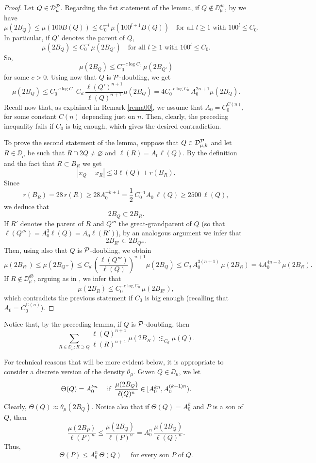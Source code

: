 \begin{proof}
	Let $Q\in{\mathcal D}_\mu^{\mathcal P}$. Regarding the fist statement of the lemma, if $Q\not\in\DD_\mu^{db}$, by  we have
	$$\mu(2B_Q)\leq \mu(100B(Q))\leq C_0^{-l}\,\mu(100^{l+1}B(Q))\quad
	\mbox{for all $l\geq1$ with $100^l\leq C_0$}.$$
	In particular, if $Q'$ denotes the parent of $Q$,
	$$\mu(2B_Q)\leq C_0^{-l}\,\mu(2B_{Q'})\quad
	\mbox{for all $l\geq1$ with $100^l\leq C_0$}.$$
	So,
	\begin{equation}\label{eqigu8208}
		\mu(2B_Q)\leq C_0^{-c\log C_0}\,\mu(2B_{Q'})
	\end{equation}
	for some $c>0$. Using now that $Q$ is ${\mathcal P}$-doubling, we get
	$$\mu(2B_Q)\leq C_0^{-c\log C_0}\,C_d\,\frac{\ell(Q')^{n+1}}{\ell(Q)^{n+1}} \mu(2B_Q)
	= 4C_0^{-c\log C_0}\,A_0^{2n+1} \mu(2B_Q)
	.$$
	Recall now that, as explained in Remark \ref{rema00}, we assume that $A_0=C_0^{C(n)}$, for some constant
	$C(n)$ depending just on $n$. Then, clearly, the preceding inequality fails if $C_0$ is big enough, which gives the desired contradiction.
	\vv
	
	To prove the second statement of the lemma, suppose that $Q\in{\mathcal D}_{\mu,k}^{\mathcal P}$ and let $R\in\DD_\mu$ be such that $R\cap 2Q\neq\varnothing$ and $\ell(R)=A_0\ell(Q)$.
	By the definition and the fact that $R\subset B_R$ we get
	$$|x_Q-x_R|\leq 3\ell(Q) + r(B_R).$$
	Since $$r(B_R)=28\,r(R) \geq 28A_0^{-k+1} = \frac12\,C_0^{-1}A_0\,\ell(Q)\geq 2500\,\ell(Q),$$
	we deduce that 
	$$2B_Q\subset 2B_R.$$
	If $R'$ denotes the parent of $R$ and $Q'''$ the great-grandparent of $Q$ (so that $\ell(Q''')=A_0^3\ell(Q)=A_0\ell(R')$), by an analogous argument we infer that
	$$2B_{R'}\subset 2B_{Q'''}.$$
	Then, using also that $Q$ is ${\mathcal P}$-doubling, we obtain
	$$\mu(2B_{R'})\leq \mu(2B_{Q'''}) \leq C_d\,\left(\frac{\ell(Q''')}{\ell(Q)}\right)^{n+1}\!\mu(2B_Q)
	\leq C_d\,A_0^{3(n+1)}\,\mu(2B_R) = 4A_0^{4n+3}\,\mu(2B_R).$$
	If $R\not\in\DD_\mu^{db}$, arguing as in , we infer that
	$$\mu(2B_R)\leq C_0^{-c\log C_0}\,\mu(2B_{R'}),$$
	which contradicts the previous statement if $C_0$ is big enough (recalling that $A_0=C_0^{C(n)}$).
\end{proof}

\vv
Notice that, by the preceding lemma, if $Q$ is ${\mathcal P}$-doubling, then 
$$\sum_{R\in\DD_\mu:R\supset Q} \frac{\ell(Q)^{n+1}}{\ell(R)^{n+1}} \,\mu(2B_R) \lesssim_{C_d} \mu(Q).$$



For technical reasons that will be more evident below, it is appropriate to consider a discrete version of the density $\theta_\mu$. Given  $Q\in\DD_\mu$, we let
$$\Theta(Q) = A_0^{kn} \quad \mbox{ if\, $\dfrac{\mu(2B_Q)}{\ell(Q)^n}\in [A_0^{kn},A_0^{(k+1)n})$}.$$
Clearly, $\Theta(Q)\approx \theta_\mu(2B_Q)$.
Notice also that if $\Theta(Q) = A_0^k$ and $P$ is a son of $Q$, then
$$
\frac{\mu(2 B_P)}{\ell(P)^n} \leq \frac{\mu(2 B_Q)}{\ell(P)^n} = A_0^n\,\frac{\mu(2 B_Q)}{\ell(Q)^n}.
$$
Thus,
\begin{equation}\label{eqson1}
	\Theta(P)\leq A_0^n\,\Theta(Q)\quad \mbox{  for every son $P$ of $Q$.}
\end{equation}


